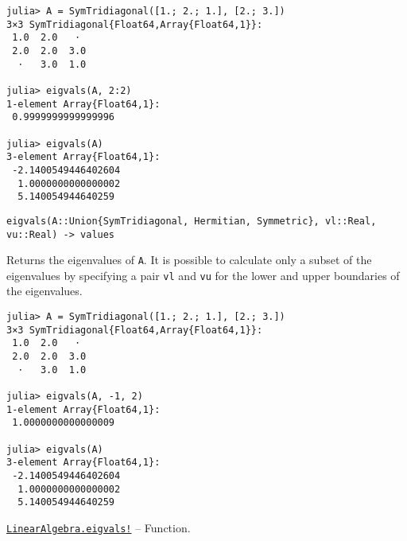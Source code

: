 \begin{adjustwidth}{2em}{0pt}
\begin{verbatim}
julia> A = SymTridiagonal([1.; 2.; 1.], [2.; 3.])
3×3 SymTridiagonal{Float64,Array{Float64,1}}:
 1.0  2.0   ⋅
 2.0  2.0  3.0
  ⋅   3.0  1.0

julia> eigvals(A, 2:2)
1-element Array{Float64,1}:
 0.9999999999999996

julia> eigvals(A)
3-element Array{Float64,1}:
 -2.1400549446402604
  1.0000000000000002
  5.140054944640259
\end{verbatim}




\begin{lstlisting}
eigvals(A::Union{SymTridiagonal, Hermitian, Symmetric}, vl::Real, vu::Real) -> values
\end{lstlisting}

Returns the eigenvalues of \texttt{A}. It is possible to calculate only a subset of the eigenvalues by specifying a pair \texttt{vl} and \texttt{vu} for the lower and upper boundaries of the eigenvalues.


\begin{verbatim}
julia> A = SymTridiagonal([1.; 2.; 1.], [2.; 3.])
3×3 SymTridiagonal{Float64,Array{Float64,1}}:
 1.0  2.0   ⋅
 2.0  2.0  3.0
  ⋅   3.0  1.0

julia> eigvals(A, -1, 2)
1-element Array{Float64,1}:
 1.0000000000000009

julia> eigvals(A)
3-element Array{Float64,1}:
 -2.1400549446402604
  1.0000000000000002
  5.140054944640259
\end{verbatim}



\end{adjustwidth}
\hypertarget{10264430947938868113}{} 
\hyperlink{10264430947938868113}{\texttt{LinearAlgebra.eigvals!}}  -- {Function.}

